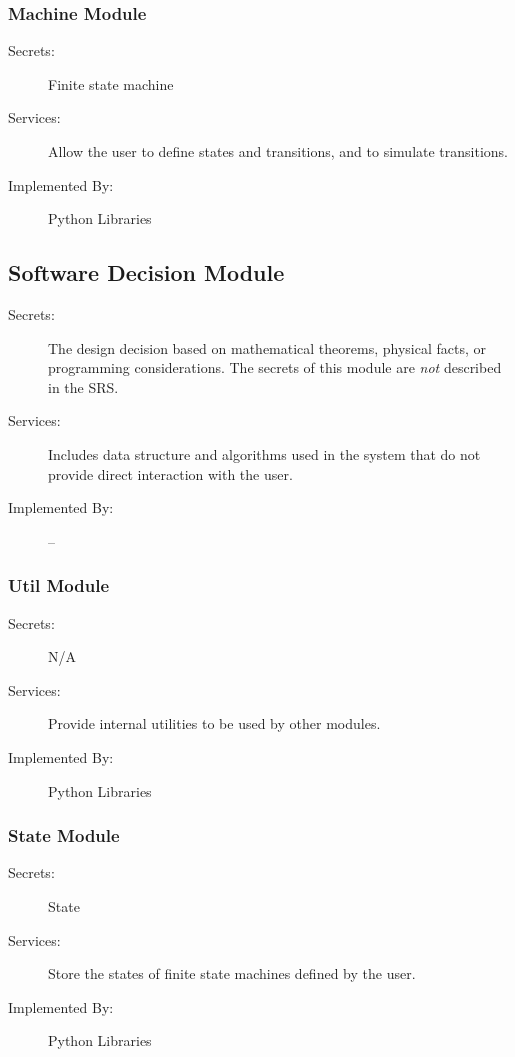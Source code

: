 \documentclass[12pt, titlepage]{article}
\begin{document}
\subsubsection{Machine Module}

\begin{description}
\item[Secrets:]Finite state machine
\item[Services:]Allow the user to define states and transitions, and to simulate
  transitions.
\item[Implemented By:] Python Libraries
\end{description}

\subsection{Software Decision Module}

\begin{description}
\item[Secrets:] The design decision based on mathematical theorems, physical
  facts, or programming considerations. The secrets of this module are
  \emph{not} described in the SRS.
\item[Services:] Includes data structure and algorithms used in the system that
  do not provide direct interaction with the user. 
\item[Implemented By:] --
\end{description}

\subsubsection{Util Module}
\begin{description}
\item[Secrets:] N/A
\item[Services:]Provide internal utilities to be used by other modules.
\item[Implemented By:] Python Libraries
\end{description}

\subsubsection{State Module}
\begin{description}
\item[Secrets:]State
\item[Services:]Store the states of finite state machines defined by the user.
\item[Implemented By:]Python Libraries
\end{description}
\end{document}
